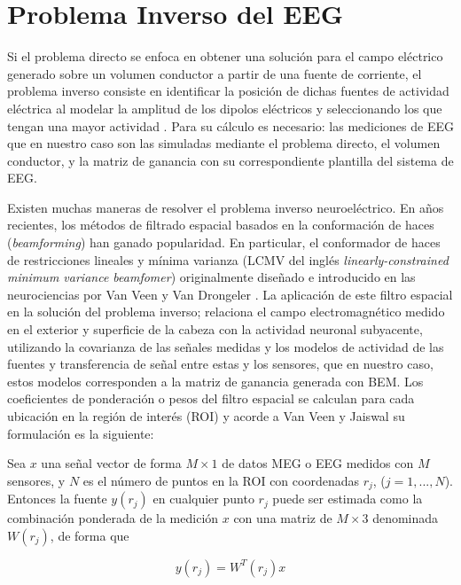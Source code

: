 \section{Problema Inverso del EEG}
\label{sec:intro:inverse}

Si el problema directo se enfoca en obtener una solución para el campo eléctrico generado sobre un volumen conductor a partir de una fuente de corriente, el problema inverso consiste en identificar la posición de dichas fuentes de actividad eléctrica al modelar la amplitud de los dipolos eléctricos y seleccionando los que tengan una mayor actividad \cite{Baillet2001}. Para su cálculo es necesario: las mediciones de EEG que en nuestro caso son las simuladas mediante el problema directo, el volumen conductor, y la matriz de ganancia con su correspondiente plantilla del sistema de EEG.

Existen muchas maneras de resolver el problema inverso neuroeléctrico. En años recientes, los métodos de filtrado espacial basados en la conformación de haces (\emph{beamforming}) han ganado popularidad. En particular, el conformador de haces de restricciones lineales y mínima varianza (LCMV del inglés \emph{linearly-constrained minimum variance beamfomer}) originalmente diseñado e introducido en las neurociencias por Van Veen y Van Drongeler \cite{VanVeen1988, VanVeen1997}. La aplicación de este filtro espacial en la solución del problema inverso; relaciona el campo electromagnético medido en el exterior y superficie de la cabeza con la actividad neuronal subyacente, utilizando la covarianza de las señales medidas y los modelos de actividad de las fuentes y transferencia de señal entre estas y los sensores, que en nuestro caso, estos modelos corresponden a la matriz de ganancia generada con BEM. Los coeficientes de ponderación o pesos del filtro espacial se calculan para cada ubicación en la región de interés (ROI) y acorde a Van Veen y Jaiswal \cite{VanVeen1997,Jaiswal2020} su formulación es la siguiente:

Sea $x$ una señal vector de forma $M \times 1$ de datos MEG o EEG medidos con $M$ sensores, y $N$ es el número de puntos en la ROI con coordenadas $r_j$, ($j = 1, ..., N$). Entonces la fuente $y(r_j)$ en cualquier punto $r_j$ puede ser estimada como la combinación ponderada de la medición $x$ con una matriz de $M \times 3$ denominada $W(r_j)$, de forma que

\begin{equation}
	\label{beamformer}
y(r_j) = W^{T}(r_j)x
\end{equation}

